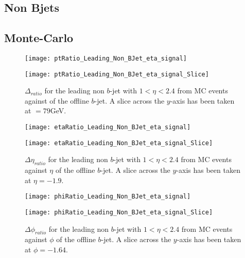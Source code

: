 \newpage
	\subsection{Non Bjets}

	\subsection{Monte-Carlo}

	\begin{figure}[h]
		\centering
		\begin{minipage}[h]{0.33\linewidth}
			\texttt{[image: ptRatio\_Leading\_Non\_BJet\_eta\_signal]}

		\end{minipage}
		\quad
		\begin{minipage}[h]{0.33\linewidth}
			\texttt{[image: ptRatio\_Leading\_Non\_BJet\_eta\_signal\_Slice]}
		\end{minipage}
		\caption{$\Delta $\pt$_{ratio}$ for the leading \pt non $b$-jet with $1 < \eta < 2.4$ from MC events against \pt of the offline $b$-jet. A slice across the $y$-axis has been taken at \pt$=79$GeV. }
		\label{fig:MC:leadingnonbptcore}
	\end{figure}

	\begin{figure}[h]
		\centering

		\begin{minipage}[h]{0.33\linewidth}
			\texttt{[image: etaRatio\_Leading\_Non\_BJet\_eta\_signal]}
		\end{minipage}
		\quad
		\begin{minipage}[h]{0.33\linewidth}
			\texttt{[image: etaRatio\_Leading\_Non\_BJet\_eta\_signal\_Slice]}
		\end{minipage}
		\caption{$\Delta \eta_{ratio}$ for the leading \pt non $b$-jet with $1 < \eta < 2.4$ from MC events against $\eta$ of the offline $b$-jet. A slice across the $y$-axis has been taken at $\eta=-1.9$. }
		\label{fig:MC:leadingnonbetacore}
	\end{figure}

	\begin{figure}[h]
		\centering

		\begin{minipage}[h]{0.33\linewidth}
			\texttt{[image: phiRatio\_Leading\_Non\_BJet\_eta\_signal]}
		\end{minipage}
		\quad
		\begin{minipage}[h]{0.33\linewidth}
			\texttt{[image: phiRatio\_Leading\_Non\_BJet\_eta\_signal\_Slice]}
		\end{minipage}
		\caption{$\Delta \phi_{ratio}$ for the leading \pt non $b$-jet with $1 < \eta < 2.4$\textbf{} from MC events against $\phi$ of the offline $b$-jet. A slice across the $y$-axis has been taken at $\phi=-1.64$. }
		\label{fig:MC:leadingnonbphicore}
	\end{figure}

